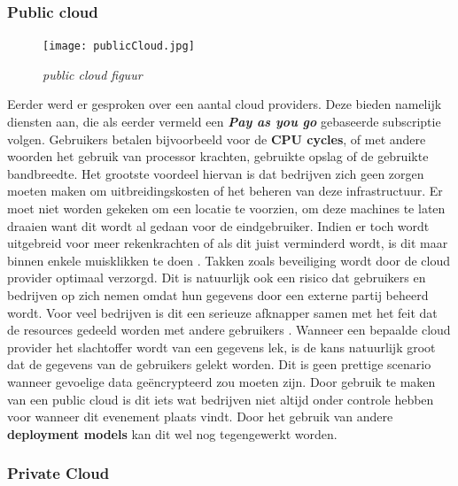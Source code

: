 \subsubsection{Public cloud}

\begin{figure}[htbp]
\centerline{\texttt{[image: publicCloud.jpg]}}
\caption{\textit{public cloud figuur \autocite{mizitechinfo}}}
\label{fig}
\end{figure}

Eerder werd er gesproken over een aantal cloud providers. Deze bieden namelijk diensten aan, die als eerder vermeld een \textbf{\textit{Pay as you go}} gebaseerde subscriptie volgen. Gebruikers betalen bijvoorbeeld voor de \textbf{CPU cycles}, of met andere woorden het gebruik van processor krachten, gebruikte opslag of de gebruikte bandbreedte. Het grootste voordeel hiervan is dat bedrijven zich geen zorgen moeten maken om uitbreidingskosten of het beheren van deze infrastructuur. Er moet niet worden gekeken om een locatie te voorzien, om deze machines te laten draaien want dit wordt al gedaan voor de eindgebruiker. Indien er toch wordt uitgebreid voor meer rekenkrachten of als dit juist verminderd wordt, is dit maar binnen enkele muisklikken te doen \autocite{Sullivan2015PAYG}. Takken zoals beveiliging wordt door de cloud provider optimaal verzorgd. Dit is natuurlijk ook een risico dat gebruikers en bedrijven op zich nemen omdat hun gegevens door een externe partij beheerd wordt. Voor veel bedrijven is dit een serieuze afknapper samen met het feit dat de resources gedeeld worden met andere gebruikers \autocite{cbtnuggets_2019}. Wanneer een bepaalde cloud provider het slachtoffer wordt van een gegevens lek, is de kans natuurlijk groot dat de gegevens van de gebruikers gelekt worden. Dit is geen prettige scenario wanneer gevoelige data geëncrypteerd zou moeten zijn. Door gebruik te maken van een public cloud is dit iets wat bedrijven niet altijd onder controle hebben voor wanneer dit evenement plaats vindt. Door het gebruik van andere \textbf{deployment models} kan dit wel nog tegengewerkt worden.


\subsubsection{Private Cloud}


